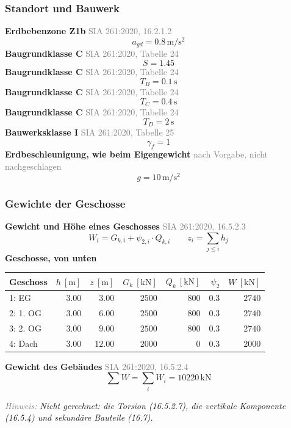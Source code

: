 \documentclass[11pt,a4paper]{article}
\newcommand{\normref}[1]{{\small\textcolor{gray}{#1}}}
\newcommand{\hinweis}[2]{\par\noindent\textcolor{gray}{\textit{#1:}} \textit{#2}\par}
\begin{document}
\subsubsection{Standort und Bauwerk}
\noindent\textbf{Erdbebenzone Z1b} \hfill \normref{SIA 261:2020, 16.2.1.2}
\begin{equation*}
a_{gd} = 0.8\,\mathrm{m}/\mathrm{s}^{2}
\end{equation*}
\noindent\textbf{Baugrundklasse C} \hfill \normref{SIA 261:2020, Tabelle 24}
\begin{equation*}
S = 1.45
\end{equation*}
\noindent\textbf{Baugrundklasse C} \hfill \normref{SIA 261:2020, Tabelle 24}
\begin{equation*}
T_B = 0.1\,\mathrm{s}
\end{equation*}
\noindent\textbf{Baugrundklasse C} \hfill \normref{SIA 261:2020, Tabelle 24}
\begin{equation*}
T_C = 0.4\,\mathrm{s}
\end{equation*}
\noindent\textbf{Baugrundklasse C} \hfill \normref{SIA 261:2020, Tabelle 24}
\begin{equation*}
T_D = 2\,\mathrm{s}
\end{equation*}
\noindent\textbf{Bauwerksklasse I} \hfill \normref{SIA 261:2020, Tabelle 25}
\begin{equation*}
\gamma_f = 1
\end{equation*}
\noindent\textbf{Erdbeschleunigung, wie beim Eigengewicht} \hfill \normref{nach Vorgabe, nicht nachgeschlagen}
\begin{equation*}
g = 10\,\mathrm{m}/\mathrm{s}^{2}
\end{equation*}
\subsubsection{Gewichte der Geschosse}
\noindent\textbf{Gewicht und Höhe eines Geschosses} \hfill \normref{SIA 261:2020, 16.5.2.3}
\begin{equation*}
W_i = G_{k,i} + \psi_{2,i} \cdot Q_{k,i} \qquad z_i = \sum_{j \le i} h_j
\end{equation*}
\noindent\textbf{Geschosse, von unten}
\begin{longtable}{lrrrrrr}
\hline
Geschoss & $h\ [\mathrm{m}]$ & $z\ [\mathrm{m}]$ & $G_k\ [\mathrm{kN}]$ & $Q_k\ [\mathrm{kN}]$ & $\psi_2$ & $W\ [\mathrm{kN}]$ \\
\hline
\endhead
1: EG & $3.00$ & $3.00$ & $2500$ & $800$ & $0.3$ & $2740$ \\
2: 1. OG & $3.00$ & $6.00$ & $2500$ & $800$ & $0.3$ & $2740$ \\
3: 2. OG & $3.00$ & $9.00$ & $2500$ & $800$ & $0.3$ & $2740$ \\
4: Dach & $3.00$ & $12.00$ & $2000$ & $0$ & $0.3$ & $2000$ \\
\hline
\end{longtable}
\noindent\textbf{Gewicht des Gebäudes} \hfill \normref{SIA 261:2020, 16.5.2.4}
\begin{equation*}
\sum W = \sum_i W_i = 10220\,\mathrm{kN}
\end{equation*}
\hinweis{Hinweis}{Nicht gerechnet: die Torsion (16.5.2.7), die vertikale Komponente (16.5.4) und sekundäre Bauteile (16.7).}
\end{document}
